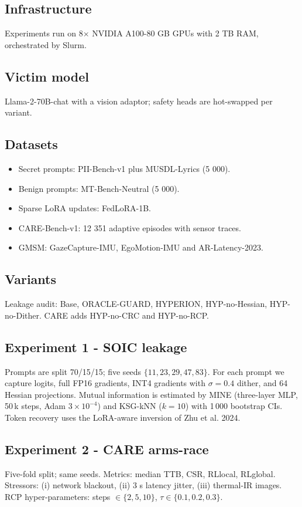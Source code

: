 \documentclass{article}
\begin{document}
\subsection{Infrastructure}
Experiments run on 8$\times$ NVIDIA A100-80 GB GPUs with 2 TB RAM, orchestrated by Slurm.

\subsection{Victim model}
Llama-2-70B-chat with a vision adaptor; safety heads are hot-swapped per variant.

\subsection{Datasets}
\begin{itemize}
  \item Secret prompts: PII-Bench-v1 plus MUSDL-Lyrics (5 000).
  \item Benign prompts: MT-Bench-Neutral (5 000).
  \item Sparse LoRA updates: FedLoRA-1B.
  \item CARE-Bench-v1: 12 351 adaptive episodes with sensor traces.
  \item GMSM: GazeCapture-IMU, EgoMotion-IMU and AR-Latency-2023.
\end{itemize}

\subsection{Variants}
Leakage audit: Base, ORACLE-GUARD, HYPERION, HYP-no-Hessian, HYP-no-Dither. CARE adds HYP-no-CRC and HYP-no-RCP.

\subsection{Experiment 1 - SOIC leakage}
Prompts are split 70/15/15; five seeds $\{11,23,29,47,83\}$. For each prompt we capture logits, full FP16 gradients, INT4 gradients with $\sigma = 0.4$ dither, and 64 Hessian projections. Mutual information is estimated by MINE (three-layer MLP, 50\,k steps, Adam $3\times 10^{-4}$) and KSG-kNN ($k = 10$) with 1\,000 bootstrap CIs. Token recovery uses the LoRA-aware inversion of Zhu et al. 2024.

\subsection{Experiment 2 - CARE arms-race}
Five-fold split; same seeds. Metrics: median TTB, CSR, RLlocal, RLglobal. Stressors: (i) network blackout, (ii) 3 s latency jitter, (iii) thermal-IR images. RCP hyper-parameters: steps $\in\{2,5,10\}$, $\tau \in\{0.1,0.2,0.3\}$.
\end{document}
